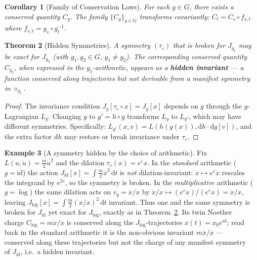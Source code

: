 \documentclass[11pt,twocolumn]{article}
\theoremstyle{plain}
\newtheorem{theorem}{Theorem}
\newtheorem{corollary}[theorem]{Corollary}
\theoremstyle{definition}
\newtheorem{example}[theorem]{Example}
\theoremstyle{remark}
\newcommand{\dd}{\mathrm{d}}
\begin{document}
\begin{corollary}[Family of Conservation Laws]\label{cor:family}
For each $g \in G$, there exists a conserved quantity $C_g$. The family $\{C_g\}_{g \in G}$ transforms covariantly: $C_t = C_s \circ f_{s,t}$ where $f_{s,t} = g_s \circ g_t^{-1}$.
\end{corollary}

\begin{theorem}[Hidden Symmetries]\label{thm:hidden}
A symmetry $(\tau_\varepsilon)$ that is broken for $J_{g_1}$ may be exact for $J_{g_2}$ (with $g_1, g_2 \in G$, $g_1 \neq g_2$). The corresponding conserved quantity $C_{g_2}$, when expressed in the $g_1$-arithmetic, appears as a \textbf{hidden invariant} --- a function conserved along trajectories but not derivable from a manifest symmetry in $\diamond_{g_1}$.
\end{theorem}

\begin{proof}
The invariance condition $J_g[\tau_\varepsilon \circ x] = J_g[x]$ depends on $g$ through the $g$-Lagrangian $L_g$. Changing $g$ to $g' = h \circ g$ transforms $L_g$ to $L_{g'}$, which may have different symmetries. Specifically: $L_{g'}(x, v) = L(h(g(x)), \dd h \cdot \dd g[v])$, and the extra factor $\dd h$ may restore or break invariance under $\tau_\varepsilon$.
\end{proof}


\begin{example}[A symmetry hidden by the choice of arithmetic]\label{ex:hidden-free}
Fix $L(u,\dot u)=\tfrac{m}{2}\dot u^2$ and the dilation $\tau_\varepsilon(x)=e^\varepsilon x$. In the \emph{standard}
arithmetic ($g=\mathrm{id}$) the action $J_{\mathrm{id}}[x]=\int\tfrac{m}{2}\dot x^2\,\dd t$ is \emph{not}
dilation-invariant: $\dot x\mapsto e^\varepsilon\dot x$ rescales the integrand by $e^{2\varepsilon}$, so the symmetry
is broken. In the \emph{multiplicative} arithmetic ($g=\log$) the same dilation acts on $v_g=\dot x/x$ by
$\dot x/x\mapsto(e^\varepsilon\dot x)/(e^\varepsilon x)=\dot x/x$, leaving $J_{\log}[x]=\int\tfrac{m}{2}(\dot x/x)^2\,\dd t$
invariant. Thus one and the same symmetry is broken for $J_{\mathrm{id}}$ yet exact for $J_{\log}$, exactly as in
Theorem~\ref{thm:hidden}. Its twin Noether charge $C_{\log}=m\dot x/x$ is conserved along the $J_{\log}$-trajectories
$x(t)=x_0e^{a t}$; read back in the standard arithmetic it is the non-obvious invariant $m\dot x/x$ --- conserved
along these trajectories but not the charge of any manifest symmetry of $J_{\mathrm{id}}$, i.e.\ a hidden invariant.
\end{example}
\end{document}
